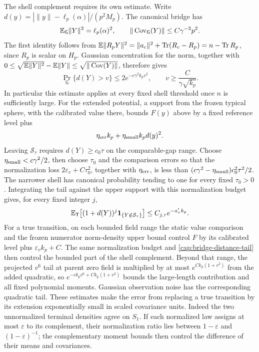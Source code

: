 The shell complement requires its own estimate. Write
\(d(y)=|\|y\|-\ell_p(\alpha)|/(p^2M_p)\). The canonical bridge has
\[
 \mathbb E_{\mathsf G}\|Y\|^2=\ell_p(\alpha)^2,
 \qquad \|\operatorname{Cov}_{\mathsf G}(Y)\|\le C\gamma^{-2}p^2.
\]
The first identity follows from
\(\mathbb E\|R_pY\|^2=\|a_c\|^2+\operatorname{Tr}(R_c-R_p)=n-\operatorname{Tr} R_p\),
since \(R_p\) is scalar on \(H_p\). Gaussian concentration for the norm,
together with
\(0\le\sqrt{\mathbb E\|Y\|^2}-\mathbb E\|Y\|\le
\sqrt{\|\operatorname{Cov}(Y)\|}\), therefore gives
\begin{equation}\label{cap:bridge-distance-tail}
 \Pr_{\mathsf G}\{d(Y)>v\}\le 2e^{-c\gamma^2k_pv^2},
 \qquad v\ge \frac{C}{\gamma\sqrt{k_p}}.
\end{equation}
In particular this estimate applies at every fixed shell threshold once
\(n\) is sufficiently large. For the extended potential, a support from
the frozen typical sphere, with the calibrated value there,
bounds \(F(y)\) above by a fixed reference level plus
\[
 \eta_{\rm err}k_p+\eta_{\rm small}k_p d(y)^2.
\]
Leaving \(\mathcal S_\tau\) requires
\(d(Y)\ge c_0\tau\) on the comparable-gap range. Choose
\(\eta_{\rm small}<c\gamma^2/2\), then choose \(\tau_0\) and the comparison
errors so that the normalization loss
\(2\varepsilon_v+C\tau_0^2\), together with \(\eta_{\rm err}\), is less than
\((c\gamma^2-\eta_{\rm small})c_0^2\tau^2/2\).
The narrower shell has canonical probability tending to one for every fixed
\(\tau_0>0\). Integrating the tail against the upper support with this
normalization budget
gives, for every fixed integer \(j\),
\[
 \mathbb E_{\mathsf T}\bigl[(1+d(Y))^j\mathbf1_{\{Y\notin\mathcal S_\tau\}}\bigr]
 \le C_{j,\tau}e^{-a'_\tau k_p}.
\]
For a true transition, on each bounded field range the static value
comparison and the frozen numerator norm-density upper bound control
\(F\) by its calibrated level plus \(\varepsilon_vk_p+C\). The same
normalization budget and \eqref{cap:bridge-distance-tail} then control the
bounded part of the shell complement. Beyond that range, the projected \(v^6\) tail at
parent zero field is multiplied by at most \(e^{Ck_p(1+v^2)}\) from the
added quadratic, so \(e^{-ck_pv^6+Ck_p(1+v^2)}\) bounds the large-length
contribution and all fixed polynomial moments. Gaussian observation noise
has the corresponding quadratic tail. These estimates make the error from
replacing a true transition by its extension exponentially small in scaled
covariance units. Indeed the two unnormalized terminal densities agree on
\(S_1\). If each normalized law assigns at most \(\varepsilon\) to its
complement, their normalization ratio lies between \(1-\varepsilon\) and
\((1-\varepsilon)^{-1}\); the complementary moment bounds then control the
difference of their means and covariances.


